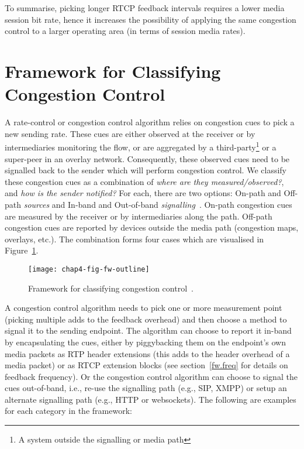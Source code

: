 To summarise, picking longer RTCP feedback intervals requires a lower media
session bit rate, hence it increases the possibility of applying the same
congestion control to a larger operating area (in terms of session media
rates).

\section{Framework for Classifying Congestion Control}
\label{fw.fw}

A rate-control or congestion control algorithm relies on congestion cues to
pick a new sending rate. These cues are either observed at the receiver or by
intermediaries monitoring the flow, or are aggregated by a
third-party\footnote{A system outside the signalling or media path} or a
super-peer in an overlay network. Consequently, these observed cues need to be
signalled back to the sender which will perform congestion control. We classify
these congestion cues as a combination of \emph{where are they
measured/observed?}, and \emph{how is the sender notified?} For each, there are
two options: On-path and Off-path \emph{sources} and In-band and Out-of-band
\emph{signalling}~\cite{Singh:PhDFw}. On-path congestion cues are measured
by the receiver or by intermediaries along the path. Off-path congestion
cues are reported by devices outside the media path (congestion maps,
overlays, etc.). The combination forms four cases which are visualised in
Figure~\ref{fig:4:fw}.

\begin{figure}[!t]
\texttt{[image: chap4-fig-fw-outline]}
\caption{Framework for classifying congestion control~\cite{Singh:PhDFw}.}
\label{fig:4:fw}
\end{figure}

A congestion control algorithm needs to pick one or more measurement point
(picking multiple adds to the feedback overhead) and then choose a method
to signal it to the sending endpoint. The algorithm can choose to report it in-band by
encapsulating the cues, either by piggybacking them on the endpoint's own media
packets as RTP header extensions (this adds to the header overhead of a media
packet) or as RTCP extension blocks (see section~\ref{fw.freq} for details on
feedback frequency). Or the congestion control algorithm can choose to signal
the cues out-of-band, i.e., re-use the signalling path (e.g., SIP, XMPP) or
setup an alternate signalling path (e.g., HTTP or websockets). The following are
examples for each category in the framework:

